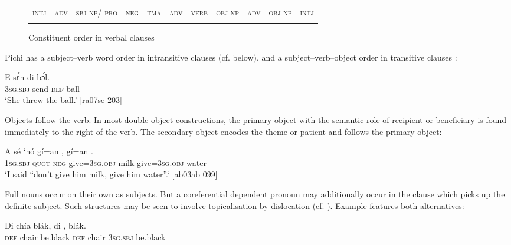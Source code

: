 \begin{figure}
\caption{Constituent order in verbal clauses}
\label{fig:key:7.1}

\begin{tabularx}{\textwidth}{XXXXXXXXXXX}
\lsptoprule
\textsc{intj} & \textsc{adv} & \textsc{sbj} \textsc{np/} \textsc{pro} & \textsc{neg} & \textsc{tma} & \textsc{adv} & \textsc{verb} & \textsc{obj} \textsc{np} & \textsc{adv} & \textsc{obj} \textsc{np} & \textsc{intj}\\
\lspbottomrule
\end{tabularx}
\end{figure}
Pichi has a subject–verb word order in intransitive clauses (cf.  below), and a subject–verb–object order in transitive clauses : 


\ea%
    \label{ex:key:513}
    \gll E    sɛ́n    di  bɔ́l.\\
\textsc{3sg.sbj}  send  \textsc{def}  ball\\

\glt ‘She threw the ball.’ [ra07se 203]
\z

Objects follow the verb. In most double-object constructions, the primary object with the semantic role of recipient or beneficiary is found immediately to the right of the verb. The secondary object encodes the theme or patient and follows the primary object:


\ea%
    \label{ex:key:514}
    \gll A    sé    ‘nó  gí=an    ,  gí=an    .\\
\textsc{1sg.sbj}  \textsc{quot}    \textsc{neg}  give=\textsc{3sg.obj}  milk    give=\textsc{3sg.obj}  water\\

\glt ‘I said “don’t give him milk, give him water”.‘ [ab03ab 099]
\z

Full nouns occur on their own as subjects. But a coreferential dependent pronoun may additionally occur in the clause which picks up the definite subject. Such structures may be seen to involve topicalisation by dislocation (cf. ). Example  features both alternatives:


\ea%
    \label{ex:key:515}
    \gll Di  chía    blák,  di  ,      blák.\\
\textsc{def}  chair  be.black  \textsc{def}  chair  \textsc{3sg.sbj}  be.black\\

